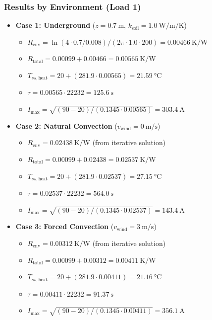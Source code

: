 \documentclass[11pt, a4paper]{article}
\begin{document}
\subsubsection{Results by Environment (Load 1)}
\begin{itemize}
    \item \textbf{Case 1: Underground} ($z=\SI{0.7}{\metre}$, $k_{\text{soil}}=\SI{1.0}{\watt\per\metre\per\kelvin}$)
        \begin{itemize}
            \item $R_{\text{env}} = \ln(4 \cdot 0.7 / 0.008) / (2\pi \cdot 1.0 \cdot 200) = \SI{0.00466}{\kelvin\per\watt}$
            \item $R_{\text{total}} = 0.00099 + 0.00466 = \SI{0.00565}{\kelvin\per\watt}$
            \item $T_{ss,\text{heat}} = 20 + (281.9 \cdot 0.00565) = \SI{21.59}{\celsius}$
            \item $\tau = 0.00565 \cdot 22232 = \SI{125.6}{\second}$
            \item $I_{\text{max}} = \sqrt{(90-20) / (0.1345 \cdot 0.00565)} = \SI{303.4}{\ampere}$
        \end{itemize}

    \item \textbf{Case 2: Natural Convection} ($v_{\text{wind}} = \SI{0}{\metre\per\second}$)
        \begin{itemize}
            \item $R_{\text{env}} = \SI{0.02438}{\kelvin\per\watt}$ (from iterative solution)
            \item $R_{\text{total}} = 0.00099 + 0.02438 = \SI{0.02537}{\kelvin\per\watt}$
            \item $T_{ss,\text{heat}} = 20 + (281.9 \cdot 0.02537) = \SI{27.15}{\celsius}$
            \item $\tau = 0.02537 \cdot 22232 = \SI{564.0}{\second}$
            \item $I_{\text{max}} = \sqrt{(90-20) / (0.1345 \cdot 0.02537)} = \SI{143.4}{\ampere}$
        \end{itemize}

    \item \textbf{Case 3: Forced Convection} ($v_{\text{wind}} = \SI{3}{\metre\per\second}$)
        \begin{itemize}
            \item $R_{\text{env}} = \SI{0.00312}{\kelvin\per\watt}$ (from iterative solution)
            \item $R_{\text{total}} = 0.00099 + 0.00312 = \SI{0.00411}{\kelvin\per\watt}$
            \item $T_{ss,\text{heat}} = 20 + (281.9 \cdot 0.00411) = \SI{21.16}{\celsius}$
            \item $\tau = 0.00411 \cdot 22232 = \SI{91.37}{\second}$
            \item $I_{\text{max}} = \sqrt{(90-20) / (0.1345 \cdot 0.00411)} = \SI{356.1}{\ampere}$
        \end{itemize}
\end{itemize}
\end{document}
